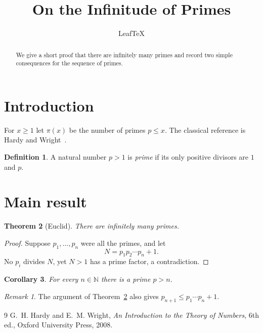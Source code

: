 \documentclass[11pt]{amsart}
\title{On the Infinitude of Primes}
\author{LeafTeX}
\newtheorem{theorem}{Theorem}[section]
\newtheorem{corollary}[theorem]{Corollary}
\theoremstyle{definition}
\newtheorem{definition}[theorem]{Definition}
\theoremstyle{remark}
\newtheorem*{remark}{Remark}
\newcommand{\N}{\mathbb{N}}
\begin{document}
\maketitle

\begin{abstract}
We give a short proof that there are infinitely many primes and record
two simple consequences for the sequence of primes.
\end{abstract}

\section{Introduction}
For $x \ge 1$ let $\pi(x)$ be the number of primes $p \le x$. The classical
reference is Hardy and Wright~\cite{hw}.

\begin{definition}
A natural number $p > 1$ is \emph{prime} if its only positive divisors are
$1$ and $p$.
\end{definition}

\section{Main result}

\begin{theorem}[Euclid]
\label{thm:infinite}
There are infinitely many primes.
\end{theorem}

\begin{proof}
Suppose $p_1, \dots, p_n$ were all the primes, and let
\[
  N = p_1 p_2 \cdots p_n + 1.
\]
No $p_i$ divides $N$, yet $N > 1$ has a prime factor, a contradiction.
\end{proof}

\begin{corollary}
For every $n \in \N$ there is a prime $p > n$.
\end{corollary}

\begin{remark}
The argument of Theorem~\ref{thm:infinite} also gives $p_{n+1} \le p_1 \cdots p_n + 1$.
\end{remark}

\begin{thebibliography}{9}
G.~H. Hardy and E.~M. Wright, \emph{An Introduction to the Theory of
Numbers}, 6th ed., Oxford University Press, 2008.
\end{thebibliography}
\end{document}

